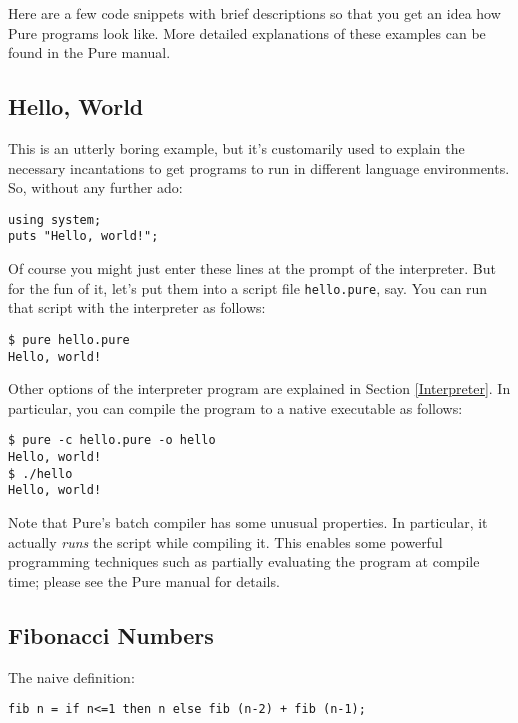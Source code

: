 \documentclass[a4paper,12pt]{article}
\begin{document}
Here are a few code snippets with brief descriptions so that you get an idea
how Pure programs look like. More detailed explanations of these examples can
be found in the Pure manual.

\subsection{Hello, World}

This is an utterly boring example, but it's customarily used to explain the
necessary incantations to get programs to run in different language
environments. So, without any further ado:

\begin{lstlisting}
using system;
puts "Hello, world!";
\end{lstlisting}

Of course you might just enter these lines at the prompt of the interpreter. But for the fun of it, let's put them into a script file \texttt{hello.pure}, say. You can run that script with the interpreter as follows:

\begin{verbatim}
$ pure hello.pure
Hello, world!
\end{verbatim}

Other options of the interpreter program are explained in Section \ref{Interpreter}. In particular, you can compile the program to a native executable as follows:

\begin{verbatim}
$ pure -c hello.pure -o hello
Hello, world!
$ ./hello
Hello, world!
\end{verbatim}

Note that Pure's batch compiler has some unusual properties. In particular, it actually \emph{runs} the script while compiling it. This enables some powerful programming techniques such as partially evaluating the program at compile time; please see the Pure manual for details.

\subsection{Fibonacci Numbers}
\label{Fibonacci}

The naive definition:

\begin{lstlisting}
fib n = if n<=1 then n else fib (n-2) + fib (n-1);
\end{lstlisting}
\end{document}
